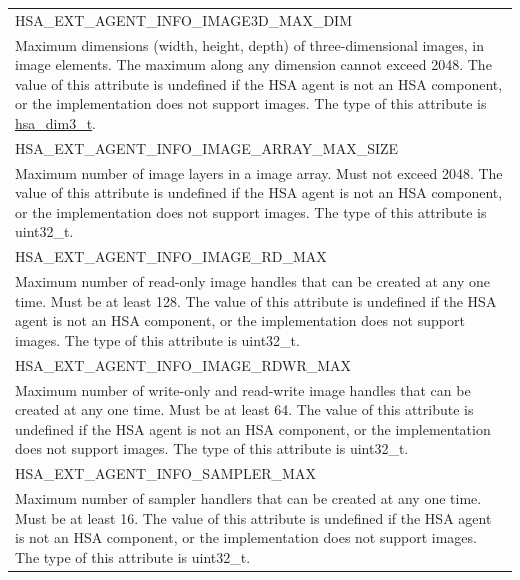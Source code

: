 \documentclass[final,oneside]{book}
\newcommand{\reftyp}[1]{#1}
\newcommand{\refenu}[1]{\reftyp{#1}}
\begin{document}
\begin{longtable}{@{\hspace{2em}}p{\linewidth-2em}}
\hspace{-2em}\refenu{HSA_\-EXT_\-AGENT_\-INFO_\-IMAGE3D_\-MAX_\-DIM}\\Maximum dimensions (width, height, depth) of three-dimensional images, in image elements. The maximum along any dimension cannot exceed 2048. The value of this attribute is undefined if the HSA agent is not an HSA component, or the implementation does not support images. The type of this attribute is \hyperlink{group__common_1ga6f7883588491965c45382cd996351aa2}{hsa_\-dim3_\-t}.\\[2mm]
\hspace{-2em}\refenu{HSA_\-EXT_\-AGENT_\-INFO_\-IMAGE_\-ARRAY_\-MAX_\-SIZE}\\Maximum number of image layers in a image array. Must not exceed 2048. The value of this attribute is undefined if the HSA agent is not an HSA component, or the implementation does not support images. The type of this attribute is uint32_\-t.\\[2mm]
\hspace{-2em}\refenu{HSA_\-EXT_\-AGENT_\-INFO_\-IMAGE_\-RD_\-MAX}\\Maximum number of read-only image handles that can be created at any one time. Must be at least 128. The value of this attribute is undefined if the HSA agent is not an HSA component, or the implementation does not support images. The type of this attribute is uint32_\-t.\\[2mm]
\hspace{-2em}\refenu{HSA_\-EXT_\-AGENT_\-INFO_\-IMAGE_\-RDWR_\-MAX}\\Maximum number of write-only and read-write image handles that can be created at any one time. Must be at least 64. The value of this attribute is undefined if the HSA agent is not an HSA component, or the implementation does not support images. The type of this attribute is uint32_\-t.\\[2mm]
\hspace{-2em}\refenu{HSA_\-EXT_\-AGENT_\-INFO_\-SAMPLER_\-MAX}\\Maximum number of sampler handlers that can be created at any one time. Must be at least 16. The value of this attribute is undefined if the HSA agent is not an HSA component, or the implementation does not support images. The type of this attribute is uint32_\-t.
\end{longtable}
\end{document}
